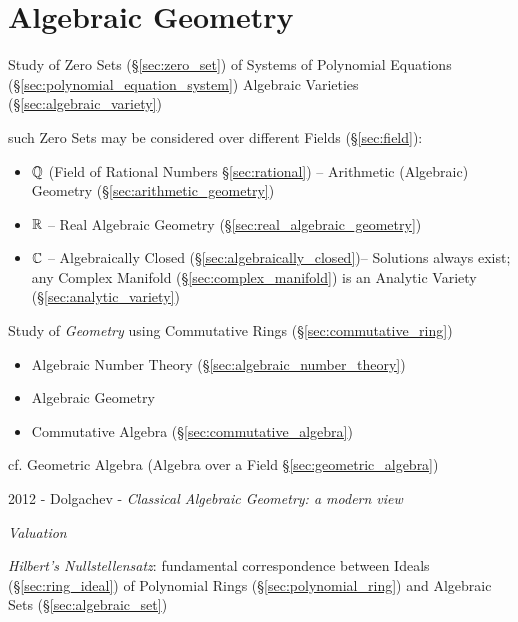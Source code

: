 \part{Algebraic Geometry}\label{part:algebraic_geometry}

Study of Zero Sets (\S\ref{sec:zero_set}) of Systems of Polynomial Equations
(\S\ref{sec:polynomial_equation_system}) \fist Algebraic Varieties
(\S\ref{sec:algebraic_variety})

such Zero Sets may be considered over different Fields (\S\ref{sec:field}):
\begin{itemize}
  \item $\mathbb{Q}$ (Field of Rational Numbers \S\ref{sec:rational}) --
    Arithmetic (Algebraic) Geometry (\S\ref{sec:arithmetic_geometry})
  \item $\mathbb{R}$ -- Real Algebraic Geometry
    (\S\ref{sec:real_algebraic_geometry})
  \item $\mathbb{C}$ -- Algebraically Closed (\S\ref{sec:algebraically_closed})--
    Solutions always exist; any Complex Manifold (\S\ref{sec:complex_manifold})
    is an Analytic Variety (\S\ref{sec:analytic_variety})
\end{itemize}

Study of \emph{Geometry} using Commutative Rings (\S\ref{sec:commutative_ring})

\begin{itemize}
  \item Algebraic Number Theory (\S\ref{sec:algebraic_number_theory})
  \item Algebraic Geometry
  \item Commutative Algebra (\S\ref{sec:commutative_algebra})
\end{itemize}

cf. Geometric Algebra (Algebra over a Field \S\ref{sec:geometric_algebra})

2012 - Dolgachev - \emph{Classical Algebraic Geometry: a modern view}

\emph{Valuation}

\emph{Hilbert's Nullstellensatz}: fundamental correspondence between Ideals
(\S\ref{sec:ring_ideal}) of Polynomial Rings (\S\ref{sec:polynomial_ring}) and
Algebraic Sets (\S\ref{sec:algebraic_set})


